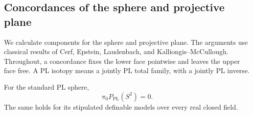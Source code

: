 \subsection{Concordances of the sphere and projective plane}

We calculate components for the sphere and projective plane.  The arguments
use classical results of Cerf, Epstein, Laudenbach, and
Kalliongis--McCullough.  Throughout, a concordance fixes the lower face
pointwise and leaves the upper face free.  A PL isotopy means a jointly
PL total family, with a jointly PL inverse.

\begin{theorem}\label{thm:two-sphere-components}
For the standard PL sphere,
\[
                    \pi_0P_{\mathrm{PL}}(S^2)=0.
\]
The same holds for its stipulated definable models over every real
closed field.
\end{theorem}

